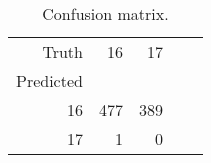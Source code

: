 \begin{table}[h]
\centering
\caption{Confusion matrix.}
\label{table:5}
\begin{tabular}{rrrrr}
\toprule
Truth & 16 & 17 \\
Predicted &  &  \\
\midrule
16 & 477 & 389 \\
17 & 1 & 0 \\
\bottomrule
\end{tabular}
\end{table}
